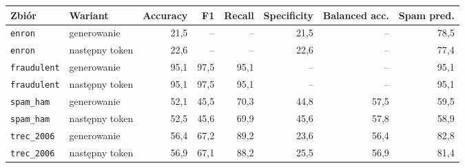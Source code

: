 \begin{tabular}{llrrrrrr}
\hline
Zbiór & Wariant & Accuracy & F1 & Recall & Specificity & Balanced acc. & Spam pred. \\
\hline
\texttt{enron} & generowanie & 21,5 & -- & -- & 21,5 & -- & 78,5 \\
\texttt{enron} & następny token & 22,6 & -- & -- & 22,6 & -- & 77,4 \\
\texttt{fraudulent} & generowanie & 95,1 & 97,5 & 95,1 & -- & -- & 95,1 \\
\texttt{fraudulent} & następny token & 95,1 & 97,5 & 95,1 & -- & -- & 95,1 \\
\texttt{spam\_ham} & generowanie & 52,1 & 45,5 & 70,3 & 44,8 & 57,5 & 59,5 \\
\texttt{spam\_ham} & następny token & 52,5 & 45,6 & 69,9 & 45,6 & 57,8 & 58,9 \\
\texttt{trec\_2006} & generowanie & 56,4 & 67,2 & 89,2 & 23,6 & 56,4 & 82,8 \\
\texttt{trec\_2006} & następny token & 56,9 & 67,1 & 88,2 & 25,5 & 56,9 & 81,4 \\
\hline
\end{tabular}
